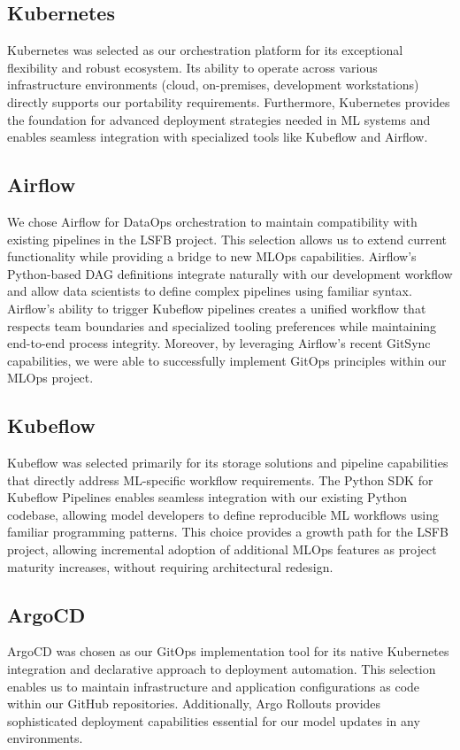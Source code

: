 \subsection{Kubernetes}\label{subsec:kubernetes}
Kubernetes was selected as our orchestration platform for its exceptional flexibility and robust ecosystem.
Its ability to operate across various infrastructure environments (cloud, on-premises, development workstations) directly supports our portability requirements.
Furthermore, Kubernetes provides the foundation for advanced deployment strategies needed in ML systems and enables seamless integration with specialized tools like Kubeflow and Airflow.


\subsection{Airflow}\label{subsec:airflow}
We chose Airflow for DataOps orchestration to maintain compatibility with existing pipelines in the LSFB project.
This selection allows us to extend current functionality while providing a bridge to new MLOps capabilities.
Airflow's Python-based DAG definitions integrate naturally with our development workflow and allow data scientists to define complex pipelines using familiar syntax.
Airflow's ability to trigger Kubeflow pipelines creates a unified workflow that respects team boundaries and specialized tooling preferences while maintaining end-to-end process integrity.
Moreover, by leveraging Airflow's recent GitSync capabilities, we were able to successfully implement GitOps principles within our MLOps project.

\subsection{Kubeflow}\label{subsec:kubeflow}
Kubeflow was selected primarily for its storage solutions and pipeline capabilities that directly address ML-specific workflow requirements.
The Python SDK for Kubeflow Pipelines enables seamless integration with our existing Python codebase, allowing model developers to define reproducible ML workflows using familiar programming patterns.
This choice provides a growth path for the LSFB project, allowing incremental adoption of additional MLOps features as project maturity increases, without requiring architectural redesign.

\subsection{ArgoCD}\label{subsec:argocd}
ArgoCD was chosen as our GitOps implementation tool for its native Kubernetes integration and declarative approach to deployment automation.
This selection enables us to maintain infrastructure and application configurations as code within our GitHub repositories.
Additionally, Argo Rollouts provides sophisticated deployment capabilities essential for our model updates in any environments.

